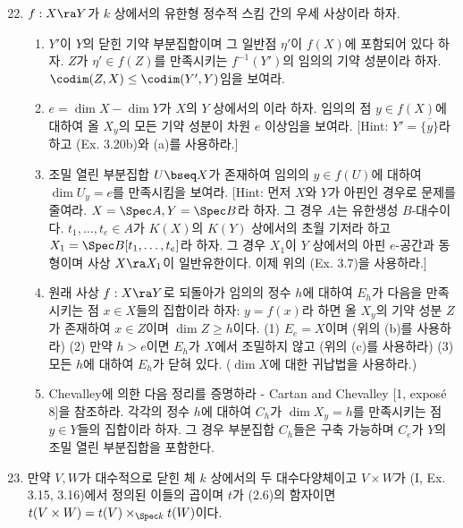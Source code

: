 	\begin{enumerate}[label=\tb{*3.\arabic*.},itemindent=0mm,itemsep=2mm]
	\setcounter{enumi}{21}
	\item {} $f:X\ra Y$가 $k$ 상에서의 유한형 정수적 스킴 간의 우세 사상이라 하자.
	\begin{enumerate}[label=(\alph*)]
	\item $Y'$이 $Y$의 닫힌 기약 부분집합이며 그 일반점 $\eta'$이 $f(X)$에 포함되어 있다 하자.
	$Z$가 $\eta'\in f(Z)$를 만족시키는 $f^{-1}(Y')$의 임의의 기약 성분이라 하자. $\codim(Z,X)\le\codim(Y',Y)$임을 보여라.
	\item $e=\dim X-\dim Y$가 $X$의 $Y$ 상에서의 이라 하자.
	임의의 점 $y\in f(X)$에 대하여 올 $X_y$의 모든 기약 성분이 차원 $e$ 이상임을 보여라.
	[Hint: $Y'=\overline{\{y\}}$라 하고 (Ex. 3.20b)와 (a)를 사용하라.]
	\item 조밀 열린 부분집합 $U\bseq X$가 존재하여 임의의 $y\in f(U)$에 대하여 $\dim U_y=e$를 만족시킴을 보여라.
	[Hint: 먼저 $X$와 $Y$가 아핀인 경우로 문제를 줄여라. $X=\Spec A,Y=\Spec B$라 하자. 그 경우 $A$는 유한생성 $B$-대수이다.
	$t_1,\ldots,t_e\in A$가 $K(X)$의 $K(Y)$ 상에서의 초월 기저라 하고 $X_1=\Spec B[t_1,\ldots,t_e]$라 하자.
	그 경우 $X_1$이 $Y$ 상에서의 아핀 $e$-공간과 동형이며 사상 $X\ra X_1$이 일반유한이다. 이제 위의 (Ex. 3.7)을 사용하라.]
	\item 원래 사상 $f:X\ra Y$로 되돌아가 임의의 정수 $h$에 대하여 $E_h$가 다음을 만족시키는 점 $x\in X$들의 집합이라 하자:
	$y=f(x)$라 하면 올 $X_y$의 기약 성분 $Z$가 존재하여 $x\in Z$이며 $\dim Z\ge h$이다.
	(1) $E_e=X$이며 (위의 (b)를 사용하라) (2) 만약 $h>e$이면 $E_h$가 $X$에서 조밀하지 않고 (위의 (c)를 사용하라)
	(3) 모든 $h$에 대하여 $E_h$가 닫혀 있다. ($\dim X$에 대한 귀납법을 사용하라.)
	\item Chevalley에 의한 다음 정리를 증명하라 - Cartan and Chevalley [1, expos\'e 8]을 참조하라.
	각각의 정수 $h$에 대하여 $C_h$가 $\dim X_y=h$를 만족시키는 점 $y\in Y$들의 집합이라 하자.
	그 경우 부분집합 $C_h$들은 구축 가능하며 $C_e$가 $Y$의 조밀 열린 부분집합을 포함한다.\\[-2.3mm]
	\end{enumerate}
	\end{enumerate}
	\begin{enumerate}[label=\tb{3.\arabic*.},itemindent=0mm,itemsep=2mm]
	\setcounter{enumi}{22}
	\item 만약 $V,W$가 대수적으로 닫힌 체 $k$ 상에서의 두 대수다양체이고 $V\times W$가
	(I, Ex. 3.15, 3.16)에서 정의된 이들의 곱이며 $t$가 (2.6)의 함자이면 $t(V\times W)=t(V)\times_{\Spec k}t(W)$이다.
	\end{enumerate}
	
